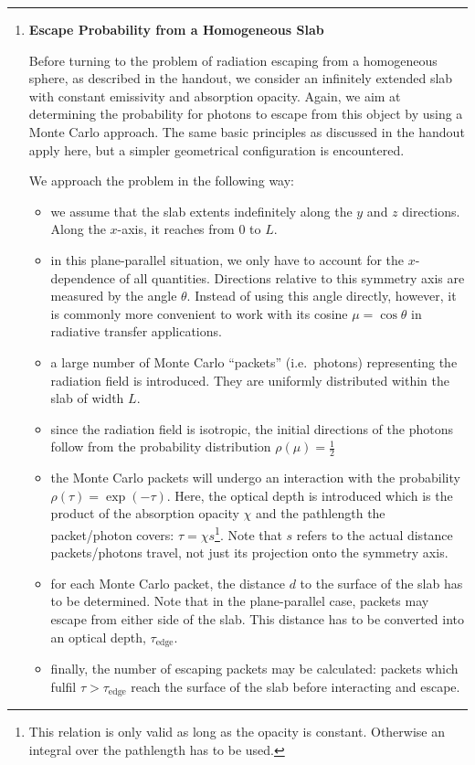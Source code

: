 \documentclass[12pt,a4paper,twoside]{article}
\begin{document}
\hrule

\begin{enumerate}
\item \textbf{Escape Probability from a Homogeneous Slab}

  Before turning to the problem of radiation escaping from a homogeneous sphere,
  as described in the handout, we consider an infinitely extended slab with
  constant emissivity and absorption opacity. Again, we aim at determining the
  probability for photons to escape from this object by using a Monte Carlo
  approach. The same basic principles as discussed in the handout apply here,
  but a simpler geometrical configuration is encountered.

  We approach the problem in the following way:
  \begin{itemize}
    \item we assume that the slab extents indefinitely along the $y$ and $z$
      directions. Along the $x$-axis, it reaches from $0$ to $L$.
    \item in this plane-parallel situation, we only have to account for the
      $x$-dependence of all quantities. Directions relative to this symmetry
      axis are measured by the angle $\theta$. Instead of using this angle
      directly, however, it is commonly more convenient to work with its
      cosine $\mu = \cos \theta$ in radiative transfer applications.
    \item a large number of Monte Carlo ``packets'' (i.e.\ photons) representing
      the radiation field is introduced. They are uniformly distributed within
      the slab of width $L$. 
    \item since the radiation field is isotropic, the initial directions of the
      photons follow from the probability distribution $\rho(\mu) =
      \frac{1}{2}$
    \item the Monte Carlo packets will undergo an interaction with the
      probability $\rho(\tau) = \exp(-\tau)$. Here, the optical depth is
      introduced which is the product of the absorption opacity $\chi$ and the
      pathlength the packet/photon covers: $\tau = \chi s$\footnote{This
        relation is only valid as long as the opacity is constant. Otherwise an
      integral over the pathlength has to be used.}. Note that $s$
      refers to the actual distance packets/photons travel, not just its
      projection onto the symmetry axis.
    \item for each Monte Carlo packet, the distance $d$ to the surface of the
      slab has to be determined. Note that in the plane-parallel case, packets
      may escape from either side of the slab. This distance has to be converted
      into an optical depth, $\tau_{\mathrm{edge}}$.
    \item finally, the number of escaping packets may be calculated: packets
      which fulfil $\tau > \tau_{\mathrm{edge}}$ reach the surface of the slab
      before interacting and escape.
  \end{itemize}
  \pagebreak


\end{enumerate}
\end{document}
